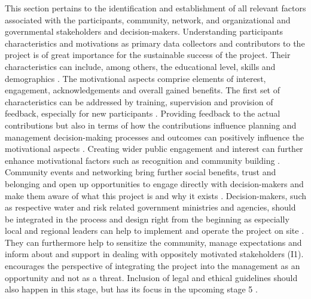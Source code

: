 This section pertains to the identification and establishment of all relevant factors associated with the participants, community, network, and organizational and governmental stakeholders and decision-makers. Understanding participants characteristics and motivations as primary data collectors and contributors to the project is of great importance for the sustainable success of the project. Their characteristics can include, among others, the educational level, skills and demographics \autocite{cervoniImplementingIntegratedWater2008,fraislCitizenScienceEnvironmental2022}. The motivational aspects comprise elements of interest, engagement, acknowledgements and overall gained benefits. The first set of characteristics can be addressed by training, supervision and provision of feedback, especially for new participants \autocite{escaTenPrinciplesCitizen2015,fraislCitizenScienceEnvironmental2022,minkmanCitizenScienceWater2015,sharpeCommunityBasedEcological2006}. Providing feedback to the actual contributions but also in terms of how the contributions influence planning and management decision-making processes and outcomes can positively influence the motivational aspects \autocite{conradMeaningfulCommunityBasedEcological2006,conradReviewCitizenScience2011,whitelawEstablishingCanadianCommunity2003}. Creating wider public engagement and interest can further enhance motivational factors such as recognition and community building \autocite{conradMeaningfulCommunityBasedEcological2006}. Community events and networking bring further social benefits, trust and belonging and open up opportunities to engage directly with decision-makers and make them aware of what this project is and why it exists \autocite{conradMeaningfulCommunityBasedEcological2006,fraislCitizenScienceEnvironmental2022,sharpeCommunityBasedEcological2006}. Decision-makers, such as respective water and risk related government ministries and agencies, should be integrated in the process and design right from the beginning as especially local and regional leaders can help to implement and operate the project on site \autocite{gualazziniEWEAEarlyWarning2021,ifrcCommunityBasedSurveillanceGuiding2017}. They can furthermore help to sensitize the community, manage expectations and inform about and support in dealing with oppositely motivated stakeholders (I1). \autocite{conradMeaningfulCommunityBasedEcological2006} encourages the perspective of integrating the project into the management as an opportunity and not as a threat. Inclusion of legal and ethical guidelines should also happen in this stage, but has its focus in the upcoming stage 5 \autocite{fraislCitizenScienceEnvironmental2022, ifrcCommunityBasedSurveillanceGuiding2017,minkmanCitizenScienceWater2015}.

